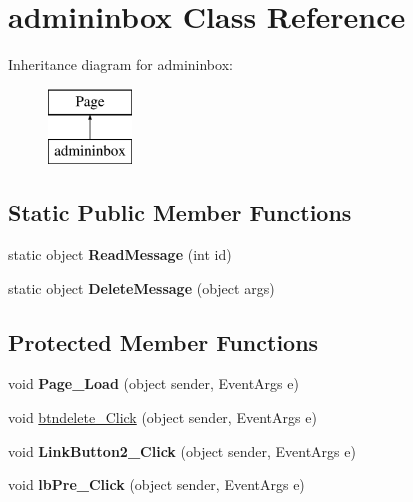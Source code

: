 \hypertarget{classadmininbox}{\section{admininbox Class Reference}
\label{classadmininbox}
}
Inheritance diagram for admininbox\-:\begin{figure}[H]
\begin{center}
\leavevmode
\includegraphics[height=2.000000cm]{classadmininbox}
\end{center}
\end{figure}
\subsection*{Static Public Member Functions}
\begin{DoxyCompactItemize}
\item 
\hypertarget{classadmininbox_a60a1a00372ec1d3d7de257c173db53d3}{static object {\bfseries Read\-Message} (int id)}\label{classadmininbox_a60a1a00372ec1d3d7de257c173db53d3}

\item 
\hypertarget{classadmininbox_afc770337f86eb257eadf046d8082016d}{static object {\bfseries Delete\-Message} (object args)}\label{classadmininbox_afc770337f86eb257eadf046d8082016d}

\end{DoxyCompactItemize}
\subsection*{Protected Member Functions}
\begin{DoxyCompactItemize}
\item 
\hypertarget{classadmininbox_a8affc3f6a49da6324782959b814ad7d3}{void {\bfseries Page\-\_\-\-Load} (object sender, Event\-Args e)}\label{classadmininbox_a8affc3f6a49da6324782959b814ad7d3}

\item 
void \hyperlink{classadmininbox_aeba572f2e0c6f40050937bc6b3a029dc}{btndelete\-\_\-\-Click} (object sender, Event\-Args e)
\item 
\hypertarget{classadmininbox_a1c338121a7e66023c10108b7a9d216f7}{void {\bfseries Link\-Button2\-\_\-\-Click} (object sender, Event\-Args e)}\label{classadmininbox_a1c338121a7e66023c10108b7a9d216f7}

\item 
\hypertarget{classadmininbox_add101808519d90270943f2353f11b6c2}{void {\bfseries lb\-Pre\-\_\-\-Click} (object sender, Event\-Args e)}\label{classadmininbox_add101808519d90270943f2353f11b6c2}

\end{DoxyCompactItemize}



